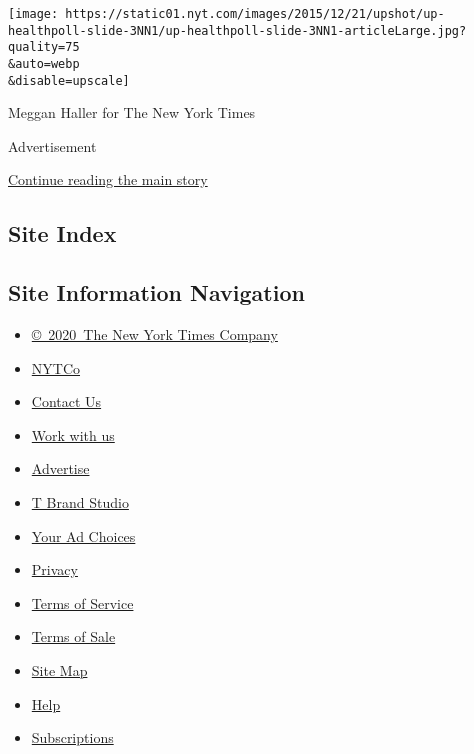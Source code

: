 \texttt{[image: https://static01.nyt.com/images/2015/12/21/upshot/up-healthpoll-slide-3NN1/up-healthpoll-slide-3NN1-articleLarge.jpg?quality=75\\\&auto=webp\\\&disable=upscale]}

Meggan Haller for The New York Times

Advertisement

\protect\hyperlink{after-bottom}{Continue reading the main story}

\hypertarget{site-index}{%
\subsection{Site Index}\label{site-index}}

\hypertarget{site-information-navigation}{%
\subsection{Site Information
Navigation}\label{site-information-navigation}}

\begin{itemize}
\tightlist
\item
  \href{https://help.nytimes.com/hc/en-us/articles/115014792127-Copyright-notice}{©~2020~The
  New York Times Company}
\end{itemize}

\begin{itemize}
\tightlist
\item
  \href{https://www.nytco.com/}{NYTCo}
\item
  \href{https://help.nytimes.com/hc/en-us/articles/115015385887-Contact-Us}{Contact
  Us}
\item
  \href{https://www.nytco.com/careers/}{Work with us}
\item
  \href{https://nytmediakit.com/}{Advertise}
\item
  \href{http://www.tbrandstudio.com/}{T Brand Studio}
\item
  \href{https://www.nytimes.com/privacy/cookie-policy\#how-do-i-manage-trackers}{Your
  Ad Choices}
\item
  \href{https://www.nytimes.com/privacy}{Privacy}
\item
  \href{https://help.nytimes.com/hc/en-us/articles/115014893428-Terms-of-service}{Terms
  of Service}
\item
  \href{https://help.nytimes.com/hc/en-us/articles/115014893968-Terms-of-sale}{Terms
  of Sale}
\item
  \href{https://spiderbites.nytimes.com}{Site Map}
\item
  \href{https://help.nytimes.com/hc/en-us}{Help}
\item
  \href{https://www.nytimes.com/subscription?campaignId=37WXW}{Subscriptions}
\end{itemize}
